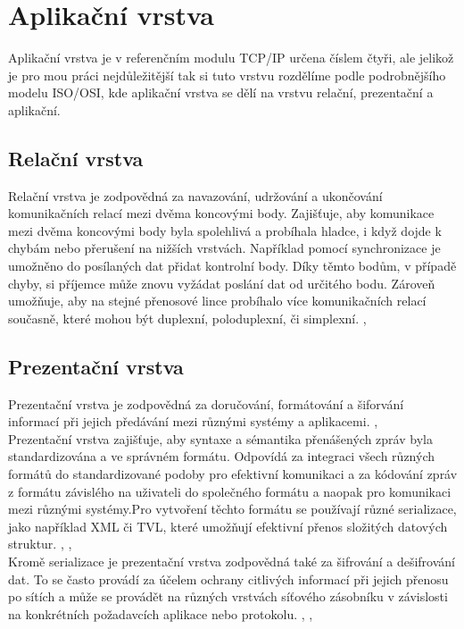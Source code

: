 \documentclass[12pt]{report}			%
\begin{document}
			\section{Aplikační  vrstva}
 Aplikační vrstva je v referenčním modulu TCP/IP určena číslem čtyři, ale jelikož je pro mou práci nejdůležitější tak si tuto vrstvu rozdělíme podle podrobnějšího modelu ISO/OSI, kde aplikační vrstva se dělí na vrstvu relační, prezentační a aplikační. 
 
 
				\subsection{Relační vrstva}
Relační vrstva je zodpovědná za navazování, udržování a ukončování komunikačních relací mezi dvěma koncovými body. Zajišťuje, aby komunikace mezi dvěma koncovými body byla spolehlivá a probíhala hladce, i když dojde k chybám nebo přerušení na nižších vrstvách. Například pomocí synchronizace je umožněno do posílaných dat přidat kontrolní body. Díky těmto bodům, v případě chyby, si příjemce může znovu vyžádat poslání dat od určitého bodu. Zároveň umožňuje, aby na stejné přenosové lince probíhalo více komunikačních relací současně, které mohou být duplexní, poloduplexní, či simplexní. \cite{session1}, \cite{session2}


				\subsection{Prezentační vrstva}
Prezentační vrstva je zodpovědná za doručování, formátování a šiforvání informací při jejich předávání mezi různými systémy a aplikacemi. \cite{presentation1}, \cite{presentation2}
\\
Prezentační vrstva zajišťuje, aby syntaxe a sémantika přenášených zpráv byla standardizována a ve správném formátu. Odpovídá za integraci všech různých formátů do standardizované podoby pro efektivní komunikaci a za kódování zpráv z formátu závislého na uživateli do společného formátu a naopak pro komunikaci mezi různými systémy.Pro vytvoření těchto formátu se používají různé serializace, jako například XML či TVL, které umožňují efektivní přenos složitých datových struktur. \cite{presentation1}, \cite{presentation2}, \cite{presentation3}
\\
Kromě serializace je prezentační vrstva zodpovědná také za šifrování a dešifrování dat. To se často provádí za účelem ochrany citlivých informací při jejich přenosu po sítích a může se provádět na různých vrstvách síťového zásobníku v závislosti na konkrétních požadavcích aplikace nebo protokolu. \cite{presentation1}, \cite{presentation2}, \cite{presentation3}
\end{document}
